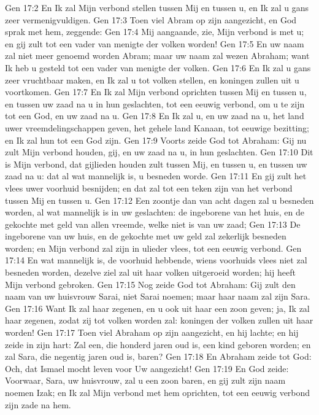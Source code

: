Gen 17:2  En Ik zal Mijn verbond stellen tussen Mij en tussen u, en Ik zal u gans zeer vermenigvuldigen.
Gen 17:3  Toen viel Abram op zijn aangezicht, en God sprak met hem, zeggende:
Gen 17:4  Mij aangaande, zie, Mijn verbond is met u; en gij zult tot een vader van menigte der volken worden!
Gen 17:5  En uw naam zal niet meer genoemd worden Abram; maar uw naam zal wezen Abraham; want Ik heb u gesteld tot een vader van menigte der volken.
Gen 17:6  En Ik zal u gans zeer vruchtbaar maken, en Ik zal u tot volken stellen, en koningen zullen uit u voortkomen.
Gen 17:7  En Ik zal Mijn verbond oprichten tussen Mij en tussen u, en tussen uw zaad na u in hun geslachten, tot een eeuwig verbond, om u te zijn tot een God, en uw zaad na u.
Gen 17:8  En Ik zal u, en uw zaad na u, het land uwer vreemdelingschappen geven, het gehele land Kanaan, tot eeuwige bezitting; en Ik zal hun tot een God zijn.
Gen 17:9  Voorts zeide God tot Abraham: Gij nu zult Mijn verbond houden, gij, en uw zaad na u, in hun geslachten.
Gen 17:10  Dit is Mijn verbond, dat gijlieden houden zult tussen Mij, en tussen u, en tussen uw zaad na u: dat al wat mannelijk is, u besneden worde.
Gen 17:11  En gij zult het vlees uwer voorhuid besnijden; en dat zal tot een teken zijn van het verbond tussen Mij en tussen u.
Gen 17:12  Een zoontje dan van acht dagen zal u besneden worden, al wat mannelijk is in uw geslachten: de ingeborene van het huis, en de gekochte met geld van allen vreemde, welke niet is van uw zaad;
Gen 17:13  De ingeborene van uw huis, en de gekochte met uw geld zal zekerlijk besneden worden; en Mijn verbond zal zijn in ulieder vlees, tot een eeuwig verbond.
Gen 17:14  En wat mannelijk is, de voorhuid hebbende, wiens voorhuids vlees niet zal besneden worden, dezelve ziel zal uit haar volken uitgeroeid worden; hij heeft Mijn verbond gebroken.
Gen 17:15  Nog zeide God tot Abraham: Gij zult den naam van uw huisvrouw Sarai, niet Sarai noemen; maar haar naam zal zijn Sara.
Gen 17:16  Want Ik zal haar zegenen, en u ook uit haar een zoon geven; ja, Ik zal haar zegenen, zodat zij tot volken worden zal: koningen der volken zullen uit haar worden!
Gen 17:17  Toen viel Abraham op zijn aangezicht, en hij lachte; en hij zeide in zijn hart: Zal een, die honderd jaren oud is, een kind geboren worden; en zal Sara, die negentig jaren oud is, baren?
Gen 17:18  En Abraham zeide tot God: Och, dat Ismael mocht leven voor Uw aangezicht!
Gen 17:19  En God zeide: Voorwaar, Sara, uw huisvrouw, zal u een zoon baren, en gij zult zijn naam noemen Izak; en Ik zal Mijn verbond met hem oprichten, tot een eeuwig verbond zijn zade na hem.
